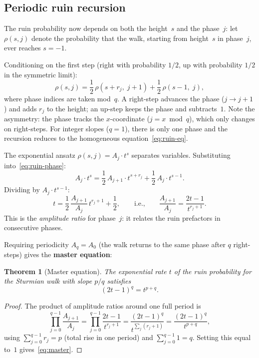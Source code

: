 \documentclass[11pt]{article}
\newtheorem{theorem}{Theorem}[section]
\theoremstyle{definition}
\theoremstyle{remark}
\begin{document}
\subsection{Periodic ruin recursion}

The ruin probability now depends on both the height~$s$ and the
phase~$j$: let $\rho(s, j)$ denote the probability that the walk,
starting from height~$s$ in phase~$j$, ever reaches $s = -1$.

Conditioning on the first step (right with probability $1/2$, up
with probability $1/2$ in the symmetric limit):
\begin{equation}\label{eq:ruin-phase}
\rho(s, j) = \frac{1}{2}\,\rho(s + r_j,\; j+1) + \frac{1}{2}\,\rho(s - 1,\; j),
\end{equation}
where phase indices are taken mod~$q$.
A right-step advances the phase ($j \to j+1$) and adds $r_j$ to the
height; an up-step keeps the phase and subtracts~$1$.
Note the asymmetry: the phase tracks the $x$-coordinate
($j = x \bmod q$), which only changes on right-steps.
For integer slopes ($q = 1$), there is only one phase and the
recursion reduces to the homogeneous equation~\eqref{eq:ruin-eq}.

The exponential ansatz $\rho(s, j) = A_j \cdot t^s$ separates
variables.
Substituting into~\eqref{eq:ruin-phase}:
\[
A_j \cdot t^s
= \frac{1}{2}\,A_{j+1} \cdot t^{s + r_j} + \frac{1}{2}\,A_j \cdot t^{s-1}.
\]
Dividing by $A_j \cdot t^{s-1}$:
\[
t = \frac{1}{2}\,\frac{A_{j+1}}{A_j}\,t^{r_j + 1} + \frac{1}{2},
\qquad\text{i.e.,}\qquad
\frac{A_{j+1}}{A_j} = \frac{2t - 1}{t^{r_j + 1}}.
\]
This is the \emph{amplitude ratio} for phase~$j$: it relates the
ruin prefactors in consecutive phases.

Requiring periodicity $A_q = A_0$ (the walk returns to the same
phase after $q$ right-steps) gives the \textbf{master equation}:

\begin{theorem}[Master equation]\label{thm:master}
The exponential rate $t$ of the ruin probability for the Sturmian walk
with slope $p/q$ satisfies
\begin{equation}\label{eq:master}
(2t - 1)^q = t^{p+q}.
\end{equation}
\end{theorem}

\begin{proof}
The product of amplitude ratios around one full period is
\[
\prod_{j=0}^{q-1} \frac{A_{j+1}}{A_j}
= \prod_{j=0}^{q-1} \frac{2t - 1}{t^{r_j + 1}}
= \frac{(2t-1)^q}{t^{\sum_j (r_j + 1)}}
= \frac{(2t-1)^q}{t^{p + q}},
\]
using $\sum_{j=0}^{q-1} r_j = p$ (total rise in one period) and
$\sum_{j=0}^{q-1} 1 = q$.
Setting this equal to~$1$ gives~\eqref{eq:master}.
\end{proof}
\end{document}

